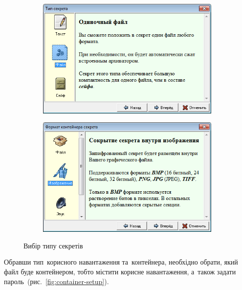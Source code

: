 \documentclass[
	a4paper,
	oneside,
	BCOR = 10mm,
	DIV = 12,
	12pt,
	headings = normal,
]{scrartcl}
\newlength{\gridunitwidth}
\begin{document}
		\begin{figure}[!htbp]
			\begin{subfigure}[b]{6 \gridunitwidth - 1em / (2-1)}
				\includegraphics[width = \columnwidth]{./assets/p02.png}
				\caption{}
				\label{subfig:fox-secret-payload-type}
			\end{subfigure}%
			\hspace{1em}%
			\begin{subfigure}[b]{6 \gridunitwidth - 1em / (2-1)}
				\includegraphics[width = \columnwidth]{./assets/p03.png}
				\caption{}
				\label{subfig:fox-secret-container-type}
			\end{subfigure}
			\caption{Вибір типу секретів}
			\label{fig:fox-secret-create-secret}
		\end{figure}

		Обравши тип~корисного навантаження та~контейнера, необхідно обрати, який файл буде контейнером, тобто містити корисне навантаження, а~також задати пароль~(рис.~\ref{fig:container-setup}).
\end{document}
